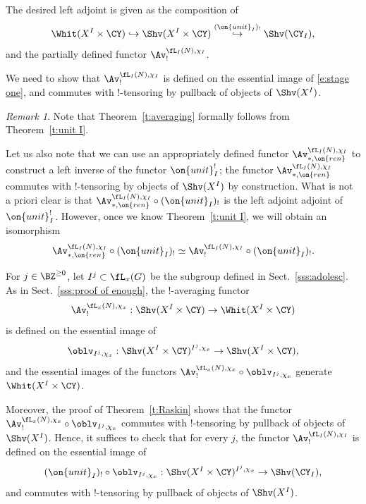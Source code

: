 \documentclass[9pt]{amsart}
\theoremstyle{definition}
\theoremstyle{remark}
\newtheorem{rem}[subsubsection]{Remark}
\newcommand{\thmref}[1]{Theorem~\ref{#1}}
\newcommand{\secref}[1]{Sect.~\ref{#1}}
\numberwithin{equation}{section}
\begin{document}
\sssec{}

The desired left adjoint is given as the composition of 
\begin{equation} \label{e:stage one}
\Whit(X^I\times \CY)\hookrightarrow \Shv(X^I\times \CY)\overset{(\on{unit}_I)_!}\hookrightarrow \Shv(\CY_I),
\end{equation}
and the partially defined functor $\Av^{\fL_I(N),\chi_I}_!$.

\medskip

We need to show that $\Av^{\fL_I(N),\chi_I}_!$ is defined on the essential image of \eqref{e:stage one},
and commutes with !-tensoring by pullback of objects of $\Shv(X^I)$.


\begin{rem}
Note that \thmref{t:averaging} formally follows from \thmref{t:unit I}. 

\medskip

Let us also note that we can use an appropriately
defined functor $\Av^{\fL_I(N),\chi_I}_{*,\on{ren}}$ to construct a left inverse of the functor $\on{unit}_I^!$; the functor
$\Av^{\fL_I(N),\chi_I}_{*,\on{ren}}$ commutes with !-tensoring by objects of $\Shv(X^I)$ by construction. 
What is not a priori
clear is that $\Av^{\fL_I(N),\chi_I}_{*,\on{ren}}\circ (\on{unit}_I)_!$ is the left adjoint adjoint of $\on{unit}_I^!$. However, once we know 
\thmref{t:unit I}, we will obtain an isomorphism
$$\Av^{\fL_I(N),\chi_I}_{*,\on{ren}}\circ (\on{unit}_I)_!\simeq \Av^{\fL_I(N),\chi_I}_!\circ (\on{unit}_I)_!.$$

\end{rem}

\sssec{}

For $j\in \BZ^{\geq 0}$, let $I^j\subset \fL_x(G)$ be the subgroup defined in \secref{sss:adolesc}. As in \secref{sss:proof of enough},
the !-averaging functor 
$$\Av^{\fL_x(N),\chi_x}_!:\Shv(X^I\times \CY)\to \Whit(X^I\times \CY)$$
is defined on the essential image of 
$$\oblv_{I^j,\chi_x}:\Shv(X^I\times \CY)^{I^j,\chi_x}\to \Shv(X^I\times \CY),$$
and the essential images of the functors $\Av^{\fL_x(N),\chi_x}_!\circ \oblv_{I^j,\chi_x}$ generate
$\Whit(X^I\times \CY)$.  

\medskip

Moreover, the proof of \thmref{t:Raskin} shows that the functor $\Av^{\fL_x(N),\chi_x}_!\circ \oblv_{I^j,\chi_x}$ 
commutes with !-tensoring by pullback of objects of $\Shv(X^I)$. Hence, it suffices to check that for every $j$, the functor
$\Av^{\fL_I(N),\chi_I}_!$ is defined on the essential image of
\begin{equation} \label{e:forget j I}
(\on{unit}_I)_!\circ \oblv_{I^j,\chi_x}: \Shv(X^I\times \CY)^{I^j,\chi_x}\to \Shv(\CY_I),
\end{equation}
and commutes with !-tensoring by pullback of objects of $\Shv(X^I)$. 
\end{document}

